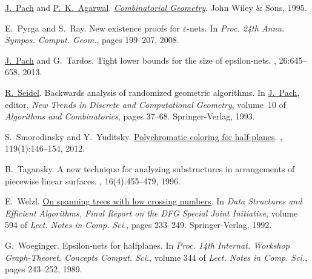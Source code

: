 \documentclass[12pt]{article}
\begin{document}
\begin{thebibliography}{MSW90}
\href{http://www.math.nyu.edu/~pach}{J.~{Pach}} and \href{http://www.cs.duke.edu/~pankaj}{P.~K.~{Agarwal}}.
\newblock \href{http://www.addall.com/Browse/Detail/0471588903.html}{{\em
  Combinatorial Geometry}}.
\newblock John Wiley \& Sons, 1995.

E.~Pyrga and S.~Ray.
\newblock  New existence proofs for $\varepsilon$-nets.
\newblock In {\em Proc. 24th Annu. Sympos. Comput. Geom.\CNFSoCG}, pages
  199--207, 2008.

\href{http://www.math.nyu.edu/~pach}{J.~{Pach}} and G.~Tardos.
\newblock  Tight lower bounds for the size of epsilon-nets.
, 26:645--658, 2013.

\href{http://www-tcs.cs.uni-sb.de/seidel/}{R.~{Seidel}}.
\newblock  Backwards analysis of randomized geometric algorithms.
\newblock In \href{http://www.math.nyu.edu/~pach}{J.~{Pach}}, editor, {\em New Trends in Discrete and Computational
  Geometry}, volume~10 of {\em Algorithms and Combinatorics}, pages 37--68.
  Springer-Verlag, 1993.

S.~Smorodinsky and Y.~Yuditsky.
\newblock \href{http://dx.doi.org/10.1016/j.jcta.2011.07.001}{Polychromatic
  coloring for half-planes}.
, 119(1):146--154, 2012.

B.~Tagansky.
\newblock  A new technique for analyzing substructures in arrangements of
  piecewise linear surfaces.
, 16(4):455--479, 1996.

E.~Welzl.
\newblock
  \href{http://www.inf.ethz.ch/personal/emo/ps-files/LowCross-LNCS594.ps}{On
  spanning trees with low crossing numbers}.
\newblock In {\em Data Structures and Efficient Algorithms, Final Report on the
  DFG Special Joint Initiative}, volume 594 of {\em Lect. Notes in Comp. Sci.},
  pages 233--249. Springer-Verlag, 1992.

G.~Woeginger.
\newblock  Epsilon-nets for halfplanes.
\newblock In {\em Proc. 14th Internat. Workshop Graph-Theoret. Concepts Comput.
  Sci.}, volume 344 of {\em Lect. Notes in Comp. Sci.}, pages 243--252, 1989.

\end{thebibliography}
\end{document}

